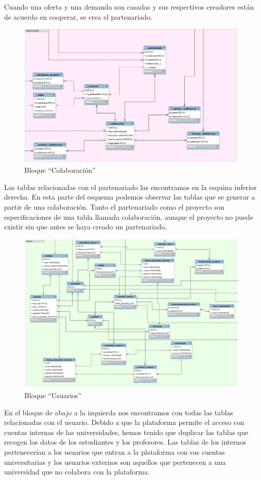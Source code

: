 \documentclass{article}
\begin{document}
Cuando una oferta y una demanda son casadas y sus respectivos creadores están de acuerdo en cooperar, se crea el partenariado.
\begin{figure}[h]
	\centering
	\includegraphics[scale=0.4]{colaboracion}
	\caption{Bloque ``Colaboración''}
	\label{fig:universe}
\end{figure}
Las tablas relacionadas con el partenariado las encontramos en la esquina inferior derecha. 
En esta parte del esquema podemos observar las tablas que se generar a partir de una colaboración. Tanto el partenariado como el proyecto son especificaciones de una tabla llamada colaboración, aunque el proyecto no puede existir sin que antes se haya creado un partenariado.
\begin{figure}[h]
	\centering
	\includegraphics[scale=0.4]{usuarios}
	\caption{Bloque ``Usuarios''}
	\label{fig:universe}
\end{figure}
En el bloque de abajo a la izquierda nos encontramos con todas las tablas relacionadas con el usuario. Debido a que la plataforma permite el acceso con cuentas internas de las universidades, hemos tenido que duplicar las tablas que recogen los datos de los estudiantes y los profesores. Las tablas de los internos pertenecerían a los usuarios que entran a la plataforma con sus cuentas universitarias y los usuarios externos son aquellos que pertenecen a una universidad que no colabora con la plataforma.
\end{document}
